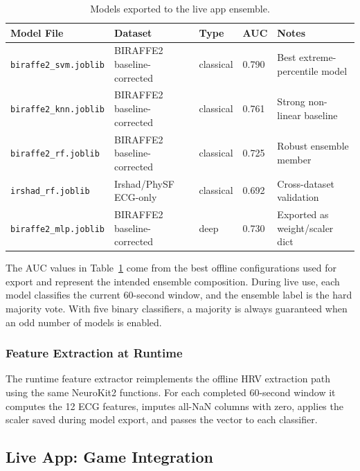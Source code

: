 \begin{table}[htbp]
    \centering
    \scriptsize
    \caption{Models exported to the live app ensemble.}
    \renewcommand{\arraystretch}{1.3}
    \begin{tabularx}{\linewidth}{|l|l|l|l|l|}
        \hline
        \rowcolor{black}
        \textbf{\color{white} Model File} & \textbf{\color{white} Dataset} & \textbf{\color{white} Type} & \textbf{\color{white} AUC} & \textbf{\color{white} Notes} \\
        \hline
        \texttt{biraffe2\_svm.joblib} & BIRAFFE2 baseline-corrected & classical & 0.790 & Best extreme-percentile model \\
        \texttt{biraffe2\_knn.joblib} & BIRAFFE2 baseline-corrected & classical & 0.761 & Strong non-linear baseline \\
        \texttt{biraffe2\_rf.joblib} & BIRAFFE2 baseline-corrected & classical & 0.725 & Robust ensemble member \\
        \texttt{irshad\_rf.joblib} & Irshad/PhySF ECG-only & classical & 0.692 & Cross-dataset validation \\
        \texttt{biraffe2\_mlp.joblib} & BIRAFFE2 baseline-corrected & deep & 0.730 & Exported as weight/scaler dict \\
        \hline
    \end{tabularx}
    \label{tab:app_models}
\end{table}

The AUC values in Table~\ref{tab:app_models} come from the best offline configurations used for export and represent the intended ensemble composition. During live use, each model classifies the current 60-second window, and the ensemble label is the hard majority vote. With five binary classifiers, a majority is always guaranteed when an odd number of models is enabled.

\subsubsection{Feature Extraction at Runtime}

The runtime feature extractor reimplements the offline HRV extraction path using the same NeuroKit2 functions. For each completed 60-second window it computes the 12 ECG features, imputes all-NaN columns with zero, applies the scaler saved during model export, and passes the vector to each classifier.

\subsection{Live App: Game Integration}

